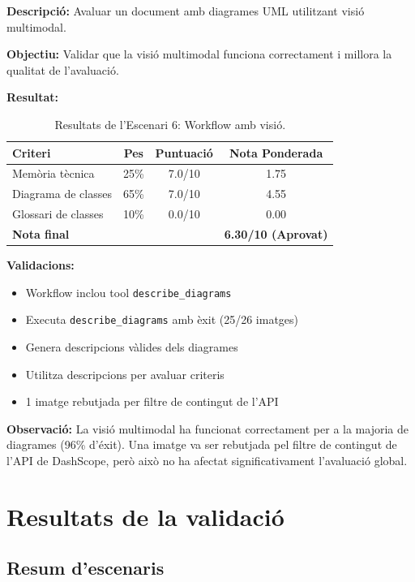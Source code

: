 \documentclass[12pt,a4paper,twoside]{report}
\begin{document}
\textbf{Descripci\'o:} Avaluar un document amb diagrames UML utilitzant visi\'o multimodal.

\textbf{Objectiu:} Validar que la visi\'o multimodal funciona correctament i millora la qualitat de l'avaluaci\'o.

\textbf{Resultat:}

\begin{table}[H]
\centering
\caption{Resultats de l'Escenari 6: Workflow amb visi\'o.}
\label{tab:escenari6}
\begin{tabular}{@{}lccc@{}}
\toprule
\textbf{Criteri} & \textbf{Pes} & \textbf{Puntuaci\'o} & \textbf{Nota Ponderada} \\
\midrule
Mem\`oria t\`ecnica & 25\% & 7.0/10 & 1.75 \\
Diagrama de classes & 65\% & 7.0/10 & 4.55 \\
Glossari de classes & 10\% & 0.0/10 & 0.00 \\
\midrule
\textbf{Nota final} & & & \textbf{6.30/10 (Aprovat)} \\
\bottomrule
\end{tabular}
\end{table}

\textbf{Validacions:}
\begin{itemize}
    \item Workflow inclou tool \texttt{describe\_diagrams}
    \item Executa \texttt{describe\_diagrams} amb \`exit (25/26 imatges)
    \item Genera descripcions v\`alides dels diagrames
    \item Utilitza descripcions per avaluar criteris
    \item 1 imatge rebutjada per filtre de contingut de l'API
\end{itemize}

\textbf{Observaci\'o:} La visi\'o multimodal ha funcionat correctament per a la majoria de diagrames (96\% d'\'exit). Una imatge va ser rebutjada pel filtre de contingut de l'API de DashScope, per\`o aix\`o no ha afectat significativament l'avaluaci\'o global.

\section{Resultats de la validaci\'o}
\label{sec:resultats-validacio}

\subsection{Resum d'escenaris}
\end{document}
